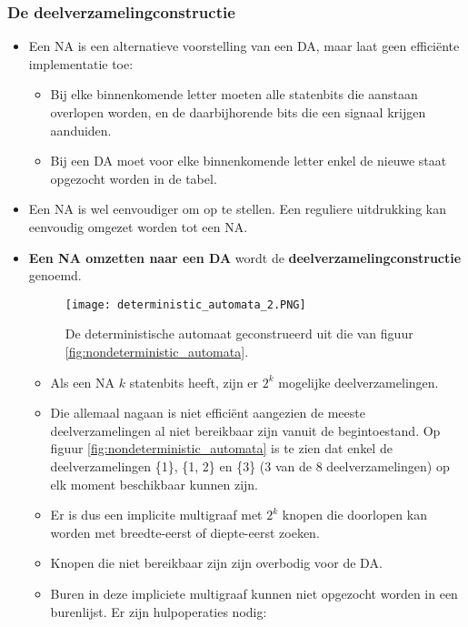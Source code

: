 \subsubsection{De deelverzamelingconstructie}
\begin{itemize}
    \item Een NA is een alternatieve voorstelling van een DA, maar laat geen efficiënte implementatie toe:
    \begin{itemize}
        \item Bij elke binnenkomende letter moeten alle statenbits die aanstaan overlopen worden, en de daarbijhorende bits die een signaal krijgen aanduiden.
        \item Bij een DA moet voor elke binnenkomende letter enkel de nieuwe staat opgezocht worden in de tabel.
    \end{itemize}
    \item Een NA is wel eenvoudiger om op te stellen. Een reguliere uitdrukking kan eenvoudig omgezet worden tot een NA.
    \item \textbf{Een NA omzetten naar een DA} wordt de \textbf{deelverzamelingconstructie} genoemd.
    \begin{figure}[ht]
        \centering
        \texttt{[image: deterministic\_automata\_2.PNG]}
        \caption{De deterministische automaat geconstrueerd uit die van figuur \ref{fig:nondeterministic_automata}.}
        \label{fig:deterministic_automata_2.PNG}
    \end{figure}
    \begin{itemize}
        \item Als een NA $k$ statenbits heeft, zijn er $2^k$ mogelijke deelverzamelingen.
        \item Die allemaal nagaan is niet efficiënt aangezien de meeste deelverzamelingen al niet bereikbaar zijn vanuit de begintoestand. Op figuur \ref{fig:nondeterministic_automata} is te zien dat enkel de deelverzamelingen \{1\}, \{1, 2\} en \{3\} (3 van de 8 deelverzamelingen) op elk moment beschikbaar kunnen zijn. 
        \item Er is dus een implicite multigraaf met $2^k$ knopen die doorlopen kan worden met breedte-eerst of diepte-eerst zoeken.
        \item Knopen die niet bereikbaar zijn zijn overbodig voor de DA.
        \item Buren in deze impliciete multigraaf kunnen niet opgezocht worden in een burenlijst. Er zijn hulpoperaties nodig:
        \begin{itemize}

\end{itemize}
\end{itemize}
\end{itemize}
